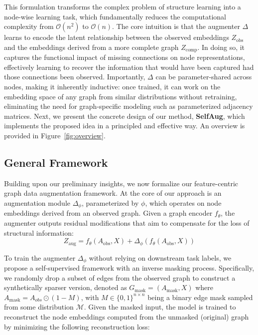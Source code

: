 \documentclass[letterpaper]{article} \usepackage{aaai2026}  \usepackage{times}  \usepackage{helvet}  \usepackage{courier}  \usepackage[hyphens]{url}  \usepackage{graphicx} \urlstyle{rm} \def\UrlFont{\rm}  \usepackage{natbib}  \usepackage{caption} \frenchspacing  \setlength{\pdfpagewidth}{8.5in}  \setlength{\pdfpageheight}{11in}
\begin{document}
This formulation transforms the complex problem of structure learning into a node-wise learning task,
which fundamentally reduces the computational complexity from \( \mathcal{O}(n^2) \) to \( \mathcal{O}(n) \). The core intuition is that the augmenter \( \Delta \) learns to encode the latent relationship between the observed embeddings \( Z_{\text{obs}} \) and the embeddings derived from a more complete graph \( Z_{\text{comp}} \). In doing so, it captures the functional impact of missing connections on node representations, effectively learning to recover the information that would have been captured had those connections been observed.
Importantly, \( \Delta \) can be parameter-shared across nodes, making it inherently inductive: once trained, it can work on the embedding space of any graph from similar distributions without retraining, eliminating the need for graph-specific modeling such as parameterized adjacency matrices.
Next, we present the concrete design of our method, \textbf{SelfAug}, which implements the proposed idea in a principled and effective way. An overview is provided in Figure~\ref{fig:overview}.

\subsection{General Framework}

Building upon our preliminary insights, we now formalize our feature-centric graph data augmentation framework. At the core of our approach is an augmentation module \( \Delta_{\phi} \), parameterized by $\phi$, which operates on node embeddings derived from an observed graph. Given a graph encoder $f_{\theta}$, the augmenter outputs residual modifications that aim to compensate for the loss of structural information:
\begin{equation}
Z_{\text{aug}} = f_{\theta}(A_{\text{obs}}, X) + \Delta_{\phi}(f_{\theta}(A_{\text{obs}}, X))
\end{equation}

To train the augmenter \( \Delta_{\phi} \) without relying on downstream task labels, we propose a self-supervised framework with an inverse masking process. Specifically, we randomly drop a subset of edges from the observed graph to construct a synthetically sparser version, denoted as \( G_{\text{mask}} = (A_{\text{mask}}, X) \) where \( A_{\text{mask}} = A_{obs} \odot (1 - M) \), with \(M \in \{0,1\}^{n \times n} \) being a binary edge mask sampled from some distribution \( \mathcal{M} \).
Given the masked input, the model is trained to reconstruct the node embeddings computed from the unmasked (original) graph by minimizing the following reconstruction loss:
\end{document}
